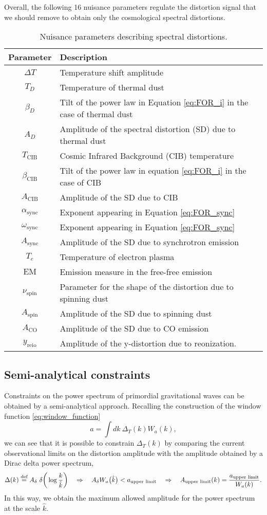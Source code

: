 Overall, the following 16 nuisance parameters regulate the distortion signal that we should remove to obtain only the cosmological spectral distortions.
\begin{table}[ht!]
\centering
\begin{tabular}{ c p{12cm} }
\hline
\textbf{Parameter} & \textbf{Description} \\
\hline
$\Delta T$      & Temperature shift amplitude \\
$T_D$           & Temperature of thermal dust \\
$\beta_D$       & Tilt of the power law in Equation \eqref{eq:FOR_i} in the case of thermal dust\\
$A_D$           & Amplitude of the spectral distortion (SD) due to thermal dust \\
$T_{\text{CIB}}$& Cosmic Infrared Background (CIB) temperature \\
$\beta_{\text{CIB}}$ & Tilt of the power law in equation \eqref{eq:FOR_i} in the case of CIB \\
$A_{\text{CIB}}$ & Amplitude of the SD due to CIB \\
$\alpha_{\text{sync}}$ & Exponent appearing in Equation \eqref{eq:FOR_sync} \\
$\omega_{\text{sync}}$ & Exponent appearing in Equation \eqref{eq:FOR_sync} \\
$A_{\text{sync}}$ & Amplitude of the SD due to synchrotron emission \\
$T_e$           & Temperature of electron plasma \\
$\mathrm{EM}$   & Emission measure in the free-free emission \\
$\nu_{\text{spin}}$ & Parameter for the shape of the distortion due to spinning dust \\
$A_{\text{spin}}$ & Amplitude of the SD due to spinning dust \\
$A_{\text{CO}}$ & Amplitude of the SD due to CO emission \\
$y_\text{reio}$ & Amplitude of the y-distortion due to reonization.\\
\hline
\end{tabular}
\caption{Nuisance parameters describing spectral distortions.}
\label{tab:nui_pixie}
\end{table}
\subsection{Semi-analytical constraints}
Constraints on the power spectrum of primordial gravitational waves can be obtained by a semi-analytical approach. Recalling the construction of the window function \eqref{eq:window_function}
$$a=\int dk\ \Delta_T(k) W_a(k),$$
we can see that it is possible to constrain $ \Delta_T(k)$ by comparing the current observational limits on the distortion amplitude with the amplitude obtained by a Dirac delta power spectrum,
$$\Delta(k)\defeq A_\delta\ \delta\bigg(\log\frac{k}{\hat k}\bigg)\quad \Rightarrow\quad A_\delta W_a\big(\hat k\big)<a_{\text{upper limit}}\quad \Rightarrow\quad A_{\text{upper limit}}(k)=\frac{a_{\text{upper limit}}}{W_a(k)}.$$
In this way, we obtain the maximum allowed amplitude for the power spectrum at the scale $\hat k$.

